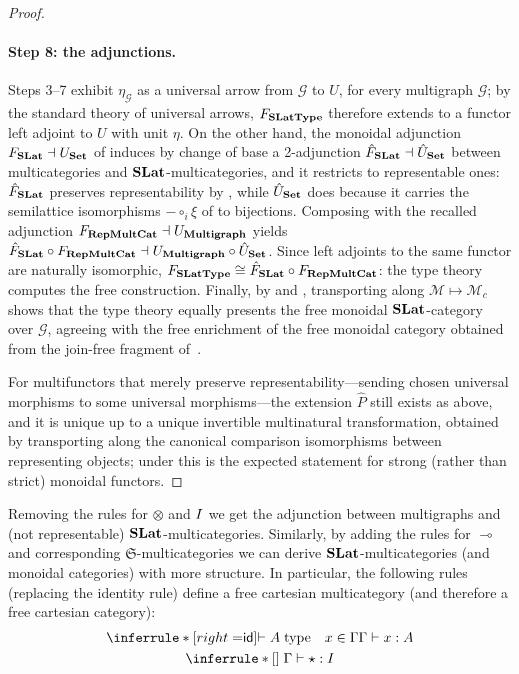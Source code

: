 \begin{proof}
\paragraph{Step 8: the adjunctions.}
Steps 3--7 exhibit $\eta_{\mathcal{G}}$ as a universal arrow from $\mathcal{G}$ to $U$, for every multigraph $\mathcal{G}$; by the standard theory of universal arrows, $F_{\mathbf{SLatType}}$ therefore extends to a functor left adjoint to $U$ with unit $\eta$.
On the other hand, the monoidal adjunction $F_{\mathbf{SLat}} \dashv U_{\mathbf{Set}}$ of  induces by change of base a 2-adjunction $\hat{F}_{\mathbf{SLat}} \dashv \hat{U}_{\mathbf{Set}}$ between multicategories and $\mathbf{SLat}$-multicategories, and it restricts to representable ones: $\hat{F}_{\mathbf{SLat}}$ preserves representability by , while $\hat{U}_{\mathbf{Set}}$ does because it carries the semilattice isomorphisms $- \circ_i \xi$ of  to bijections.
Composing with the recalled adjunction $F_{\mathbf{RepMultCat}} \dashv U_{\mathbf{Multigraph}}$ yields
$\hat{F}_{\mathbf{SLat}} \circ F_{\mathbf{RepMultCat}} \dashv U_{\mathbf{Multigraph}} \circ \hat{U}_{\mathbf{Set}}$.
Since left adjoints to the same functor are naturally isomorphic, $F_{\mathbf{SLatType}} \cong \hat{F}_{\mathbf{SLat}} \circ F_{\mathbf{RepMultCat}}$: the type theory computes the free construction.
Finally, by  and , transporting along $\mathcal{M} \mapsto \mathcal{M}_c$ shows that the type theory equally presents the free monoidal $\mathbf{SLat}$-category over $\mathcal{G}$, agreeing with the free enrichment of the free monoidal category obtained from the join-free fragment of~.

For multifunctors that merely preserve representability---sending chosen universal morphisms to some universal morphisms---the extension $\hat{P}$ still exists as above, and it is unique up to a unique invertible multinatural transformation, obtained by transporting along the canonical comparison isomorphisms between representing objects; under  this is the expected statement for strong (rather than strict) monoidal functors.
\end{proof}
\begin{remark}
  Removing the rules for $\otimes$ and $I$ we get the adjunction between multigraphs and (not representable) $\mathbf{SLat}$-multicategories.
  Similarly, by adding the rules for $\multimap$ and corresponding $\mathfrak{S}$-multicategories we can derive $\mathbf{SLat}$-multicategories (and monoidal categories) with more structure.
  In particular, the following rules (replacing the identity rule) define a free cartesian multicategory (and therefore a free cartesian category):
  \begin{gather*}
  \inferrule*[right=$\id$]{\vdash A\;\text{type} \quad x \in \Gamma}{\Gamma \vdash x : A}\\
  \inferrule*[]{\;}{\Gamma \vdash \star : \I}
  \end{gather*}
\end{remark}

